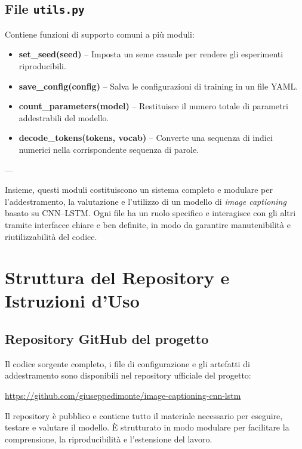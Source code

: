 \documentclass[11pt,a4paper]{report}
\begin{document}
\section{File \texttt{utils.py}}

Contiene funzioni di supporto comuni a più moduli:
\begin{itemize}
  \item \textbf{set\_seed(seed)} – Imposta un seme casuale per rendere gli esperimenti riproducibili.
  \item \textbf{save\_config(config)} – Salva le configurazioni di training in un file YAML.
  \item \textbf{count\_parameters(model)} – Restituisce il numero totale di parametri addestrabili del modello.
  \item \textbf{decode\_tokens(tokens, vocab)} – Converte una sequenza di indici numerici nella corrispondente sequenza di parole.
\end{itemize}

---

Insieme, questi moduli costituiscono un sistema completo e modulare per l’addestramento, la valutazione e l’utilizzo di un modello di \emph{image captioning} basato su CNN–LSTM.  
Ogni file ha un ruolo specifico e interagisce con gli altri tramite interfacce chiare e ben definite, in modo da garantire manutenibilità e riutilizzabilità del codice.






\appendix
\chapter{Struttura del Repository e Istruzioni d'Uso}

\section{Repository GitHub del progetto}

Il codice sorgente completo, i file di configurazione e gli artefatti di addestramento sono disponibili nel repository ufficiale del progetto:

\begin{tcolorbox}[colback=gray!5!white, colframe=gray!70!black, title=Repository ufficiale]
\url{https://github.com/giuseppedimonte/image-captioning-cnn-lstm}
\end{tcolorbox}

Il repository è pubblico e contiene tutto il materiale necessario per eseguire, testare e valutare il modello.  
È strutturato in modo modulare per facilitare la comprensione, la riproducibilità e l'estensione del lavoro.
\end{document}
